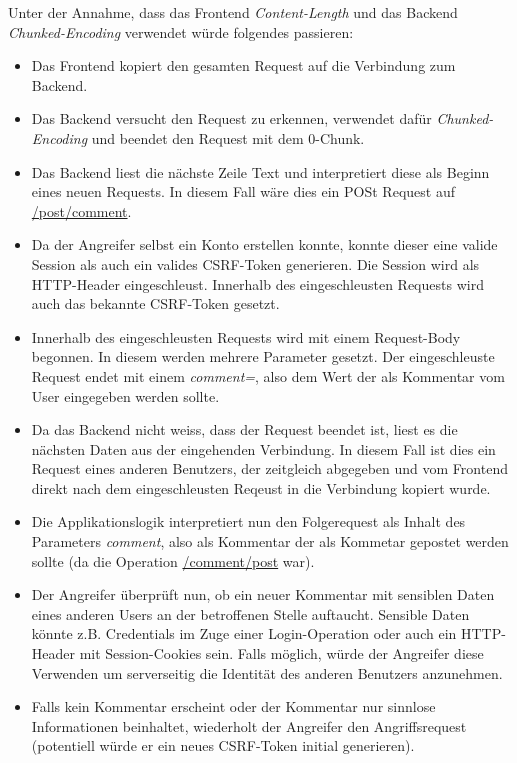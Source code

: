 Unter der Annahme, dass das Frontend \textit{Content-Length} und das Backend \textit{Chunked-Encoding} verwendet würde folgendes passieren:
\begin{itemize}
	\item Das Frontend kopiert den gesamten Request auf die Verbindung zum Backend.
	\item Das Backend versucht den Request zu erkennen, verwendet dafür \textit{Chunked-Encoding} und beendet den Request mit dem 0-Chunk.
	\item Das Backend liest die nächste Zeile Text und interpretiert diese als Beginn eines neuen Requests. In diesem Fall wäre dies ein POSt Request auf \url{/post/comment}.
	\item Da der Angreifer selbst ein Konto erstellen konnte, konnte dieser eine valide Session als auch ein valides CSRF-Token generieren. Die Session wird als HTTP-Header eingeschleust. Innerhalb des eingeschleusten Requests wird auch das bekannte CSRF-Token gesetzt.
	\item Innerhalb des eingeschleusten Requests wird mit einem Request-Body begonnen. In diesem werden mehrere Parameter gesetzt. Der eingeschleuste Request endet mit einem \textit{comment=}, also dem Wert der als Kommentar vom User eingegeben werden sollte.
	\item Da das Backend nicht weiss, dass der Request beendet ist, liest es die nächsten Daten aus der eingehenden Verbindung. In diesem Fall ist dies ein Request eines anderen Benutzers, der zeitgleich abgegeben und vom Frontend direkt nach dem eingeschleusten Reqeust in die Verbindung kopiert wurde.
	\item Die Applikationslogik interpretiert nun den Folgerequest als Inhalt des Parameters \textit{comment}, also als Kommentar der als Kommetar gepostet werden sollte (da die Operation \url{/comment/post} war).
	\item Der Angreifer überprüft nun, ob ein neuer Kommentar mit sensiblen Daten eines anderen Users an der betroffenen Stelle auftaucht. Sensible Daten könnte z.B. Credentials im Zuge einer Login-Operation oder auch ein HTTP-Header mit Session-Cookies sein. Falls möglich, würde der Angreifer diese Verwenden um serverseitig die Identität des anderen Benutzers anzunehmen.
	\item Falls kein Kommentar erscheint oder der Kommentar nur sinnlose Informationen beinhaltet, wiederholt der Angreifer den Angriffsrequest (potentiell würde er ein neues CSRF-Token initial generieren).
\end{itemize}


